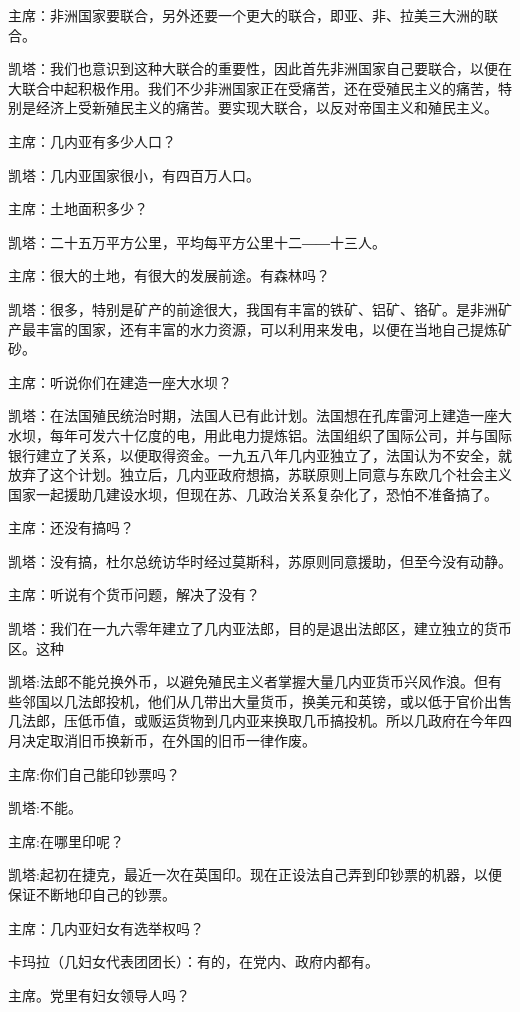 主席：非洲国家要联合，另外还要一个更大的联合，即亚、非、拉美三大洲的联合。

凯塔：我们也意识到这种大联合的重要性，因此首先非洲国家自己要联合，以便在大联合中起积极作用。我们不少非洲国家正在受痛苦，还在受殖民主义的痛苦，特别是经济上受新殖民主义的痛苦。要实现大联合，以反对帝国主义和殖民主义。

主席：几内亚有多少人口？

凯塔：几内亚国家很小，有四百万人口。

主席：土地面积多少？

凯塔：二十五万平方公里，平均每平方公里十二――十三人。

主席：很大的土地，有很大的发展前途。有森林吗？

凯塔：很多，特别是矿产的前途很大，我国有丰富的铁矿、铝矿、铬矿。是非洲矿产最丰富的国家，还有丰富的水力资源，可以利用来发电，以便在当地自己提炼矿砂。

主席：听说你们在建造一座大水坝？

凯塔：在法国殖民统治时期，法国人已有此计划。法国想在孔库雷河上建造一座大水坝，每年可发六十亿度的电，用此电力提炼铝。法国组织了国际公司，并与国际银行建立了关系，以便取得资金。一九五八年几内亚独立了，法国认为不安全，就放弃了这个计划。独立后，几内亚政府想搞，苏联原则上同意与东欧几个社会主义国家一起援助几建设水坝，但现在苏、几政治关系复杂化了，恐怕不准备搞了。

主席：还没有搞吗？

凯塔：没有搞，杜尔总统访华时经过莫斯科，苏原则同意援助，但至今没有动静。

主席：听说有个货币问题，解决了没有？

凯塔：我们在一九六零年建立了几内亚法郎，目的是退出法郎区，建立独立的货币区。这种

凯塔:法郎不能兑换外币，以避免殖民主义者掌握大量几内亚货币兴风作浪。但有些邻国以几法郎投机，他们从几带出大量货币，换美元和英镑，或以低于官价出售几法郎，压低币值，或贩运货物到几内亚来换取几币搞投机。所以几政府在今年四月决定取消旧币换新币，在外国的旧币一律作废。

主席:你们自己能印钞票吗？

凯塔:不能。

主席:在哪里印呢？

凯塔:起初在捷克，最近一次在英国印。现在正设法自己弄到印钞票的机器，以便保证不断地印自己的钞票。

主席：几内亚妇女有选举权吗？

卡玛拉（几妇女代表团团长）：有的，在党内、政府内都有。

主席。党里有妇女领导人吗？

